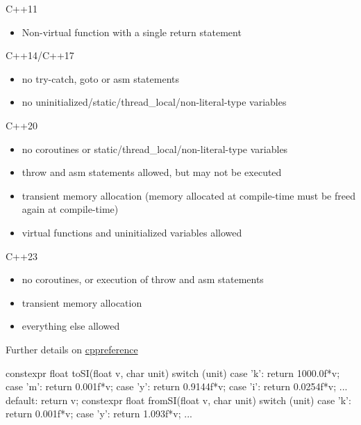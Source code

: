 \begin{frame}[fragile,shrink=15]
   \begin{block}{C++11}
     \begin{itemize}
     \item Non-virtual function with a single return statement
     \end{itemize}
   \end{block}
   \begin{block}{C++14/C++17}
    \begin{itemize}
    \item no try-catch, goto or asm statements
    \item no uninitialized/static/thread\_local/non-literal-type variables
    \end{itemize}
  \end{block}
   \begin{block}{C++20}
    \begin{itemize}
    \item no coroutines or static/thread\_local/non-literal-type variables
    \item throw and asm statements allowed, but may not be executed
    \item transient memory allocation
          (memory allocated at compile-time must be freed again at compile-time)
    \item virtual functions and uninitialized variables allowed
    \end{itemize}
  \end{block}
  \begin{block}{C++23}
    \begin{itemize}
    \item no coroutines, or execution of throw and asm statements
    \item transient memory allocation
    \item everything else allowed
    \end{itemize}
  \end{block}
  Further details on \href{https://en.cppreference.com/w/cpp/language/constexpr}{cppreference}
\end{frame}

\begin{frame}[fragile]
  \begin{cppcode*}{}
    constexpr float toSI(float v, char unit) {
      switch (unit) {
      case 'k': return 1000.0f*v;
      case 'm': return 0.001f*v;
      case 'y': return 0.9144f*v;
      case 'i': return 0.0254f*v;
      ...
      default: return v;
      }
    }
    constexpr float fromSI(float v, char unit) {
      switch (unit) {
        case 'k': return 0.001f*v;
        case 'y': return 1.093f*v;
      ...
      }
    }
  \end{cppcode*}
\end{frame}

